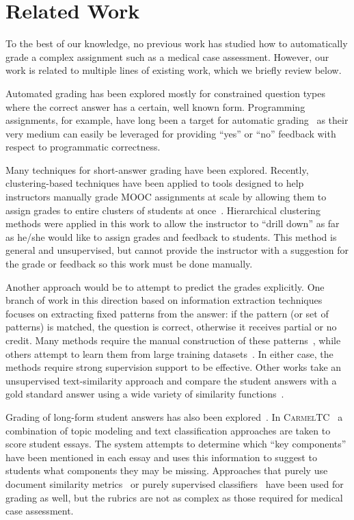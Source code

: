 \section{Related Work}

To the best of our knowledge, no previous work has studied how to automatically grade
a complex assignment such as a medical case assessment. However, our work
is related to multiple lines of existing work, which we briefly review below. 

Automated grading has been explored mostly for constrained question
types where the correct answer has a certain, well known form. Programming
assignments, for example, have long been a target for automatic
grading~\cite{Forsythe:1965:CACM, Hext:1969:CACM, Helmick:2007:ITICSE,
Martin:1973:SIGCSE} as their very medium can easily be leveraged for
providing ``yes'' or ``no'' feedback with respect to programmatic
correctness.

Many techniques for short-answer grading have been explored. Recently,
clustering-based techniques have been applied to tools designed to help
instructors manually grade MOOC assignments at scale by allowing them to
assign grades to entire clusters of students at
once~\cite{Brooks:2014:Powergrading}. Hierarchical clustering methods were
applied in this work to allow the instructor to ``drill down'' as far as
he/she would like to assign grades and feedback to students. This method
is general and unsupervised, but cannot provide the instructor with a
suggestion for the grade or feedback so this work must be done manually.

Another approach would be to attempt to predict the grades explicitly. One
branch of work in this direction based on information extraction techniques
focuses on extracting fixed patterns from the answer: if the pattern (or
set of patterns) is matched, the question is correct, otherwise it receives
partial or no credit. Many methods require the manual construction of these
patterns~\cite{Mitchell:2002:ICAA, Leacock:2003:CatH}, while others attempt to
learn them from large training datasets~\cite{Pulman:2005:EdAppsNLP}. In either
case, the methods require strong supervision support to be effective.  Other
works take an unsupervised text-similarity approach and compare the student
answers with a gold standard answer using a wide variety of similarity
functions~\cite{Mohler:2009:EACL}.

Grading of long-form student answers has also been
explored~\cite{Balfour:2013, Chen:2014:IRRODL}. In
\textsc{CarmelTC}~\cite{Rose:2003:HLT-NAACL-EDUC} a combination of topic
modeling and text classification approaches are taken to score student
essays. The system attempts to determine which ``key components'' have been
mentioned in each essay and uses this information to suggest to students
what components they may be missing. Approaches that purely use document
similarity metrics~\cite{Duwairi:2006:CHB} or purely supervised
classifiers~\cite{Larkey:1998:SIGIR} have been used for grading as well, but the rubrics
are not as complex as those required for medical case assessment. 


